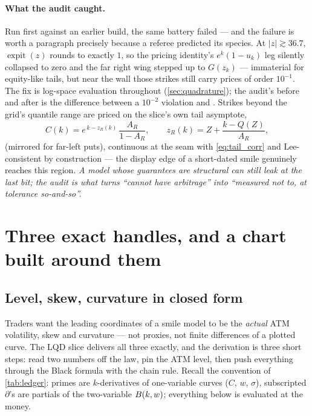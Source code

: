 \documentclass[11pt]{article}
\begin{document}
\paragraph{What the audit caught.}  Run first against an earlier build, the
same battery failed --- and the failure is worth a paragraph precisely
because a referee predicted its species.  At $|z|\gtrsim36.7$,
$\operatorname{expit}(z)$ rounds to exactly $1$, so the pricing identity's
$e^{k}(1-u_k)$ leg silently collapsed to zero and the far right wing
stepped up to $G(z_k)$ --- immaterial for equity-like tails, but near the
wall those strikes still carry prices of order $10^{-1}$.  The fix is
log-space evaluation throughout (\cref{sec:quadrature}); the audit's before
and after is the difference between a $10^{-2}$ violation and
\lqdrefcertfly.  Strikes beyond the grid's quantile range are priced on the
slice's own tail asymptote,
\begin{equation}
C(k)=e^{\,k-z_R(k)}\,\frac{A_R}{1-A_R},
\qquad z_R(k)=Z+\frac{k-Q(Z)}{A_R},
\label{eq:beyond_grid}
\end{equation}
(mirrored for far-left puts), continuous at the seam with
\eqref{eq:tail_corr} and Lee-consistent by construction --- the display
edge of a short-dated smile genuinely reaches this region.
\emph{A model whose guarantees are structural can still leak at the last
bit; the audit is what turns ``cannot have arbitrage'' into ``measured not
to, at tolerance so-and-so''.}

\section{Three exact handles, and a chart built around them}
\label{sec:handles}

\subsection{Level, skew, curvature in closed form}
\label{sec:atm_exact}

Traders want the leading coordinates of a smile model to be the \emph{actual}
ATM volatility, skew and curvature --- not proxies, not finite differences
of a plotted curve.  The LQD slice delivers all three exactly, and the
derivation is three short steps: read two numbers off the law, pin the ATM
level, then push everything through the Black formula with the chain rule.
Recall the convention of \cref{tab:ledger}: primes are $k$-derivatives of
one-variable curves ($C$, $w$, $\sigma$), subscripted $\partial$'s are
partials of the two-variable $B(k,w)$; everything below is evaluated at
the money.
\end{document}
